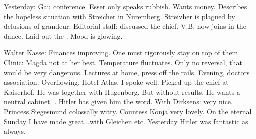 Yesterday: Gau conference. Esser only speaks rubbish. Wants money. Describes the hopeless situation with Streicher in Nuremberg. Streivher is plagued by delusions of grandeur. Editorial staff: discussed the chief. V.B. now joins in the dance. Laid out the . Mood is glowing.

Walter Kasse: Finances improving. One must rigorously stay on top of them. Clinic: Magda not at her best. Temperature fluctuates. Only no reversal, that would be very dangerous. Lectures at home, press off the rails. Evening, doctors association. Overflowing. Hotel Atlas. I spoke well. Picked up the chief at Kaiserhof. He was together with Hugenberg. But without results. He wants a neutral cabinet. . Hitler has given him the word. With Dirksens: very nice. Princess Siegesmund colossally witty. Countess Konja very lovely. On the eternal Sunday I have made great...with Gleichen etc.  Yesterday Hitler was fantastic as always.